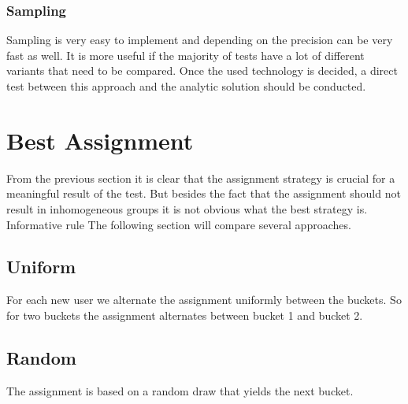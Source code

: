 \documentclass[../Thesis.tex]{subfiles}
\begin{document}
\subsubsection{Sampling}
Sampling is very easy to implement and depending on the precision can be very fast as well. It is more useful if the majority of tests have a lot of different variants that need to be compared. Once the used technology is decided, a direct test between this approach and the analytic solution should be conducted.

\section{Best Assignment}
From the previous section it is clear that the assignment strategy is crucial for a meaningful result of the test. But besides the fact that the assignment should not result in inhomogeneous groups it is not obvious what the best strategy is. Informative rule The following section will compare several approaches.

\subsection{Uniform}
For each new user we alternate the assignment uniformly between the buckets. So for two buckets the assignment alternates between bucket 1 and bucket 2.

\subsection{Random}
The assignment is based on a random draw that yields the next bucket.
\end{document}
